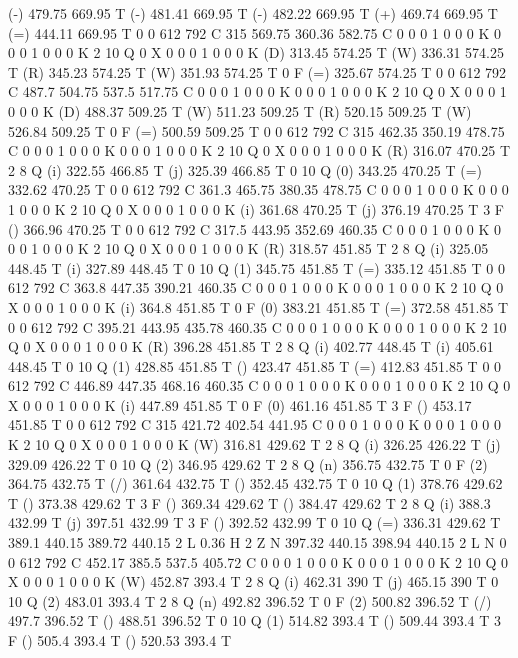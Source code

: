 (-) 479.75 669.95 T
(-) 481.41 669.95 T
(-) 482.22 669.95 T
(+) 469.74 669.95 T
(=) 444.11 669.95 T
0 0 612 792 C
315 569.75 360.36 582.75 C
0 0 0 1 0 0 0 K
0 0 0 1 0 0 0 K
2 10 Q
0 X
0 0 0 1 0 0 0 K
(D) 313.45 574.25 T
(W) 336.31 574.25 T
(R) 345.23 574.25 T
(W) 351.93 574.25 T
0 F
(=) 325.67 574.25 T
0 0 612 792 C
487.7 504.75 537.5 517.75 C
0 0 0 1 0 0 0 K
0 0 0 1 0 0 0 K
2 10 Q
0 X
0 0 0 1 0 0 0 K
(D) 488.37 509.25 T
(W) 511.23 509.25 T
(R) 520.15 509.25 T
(W) 526.84 509.25 T
0 F
(=) 500.59 509.25 T
0 0 612 792 C
315 462.35 350.19 478.75 C
0 0 0 1 0 0 0 K
0 0 0 1 0 0 0 K
2 10 Q
0 X
0 0 0 1 0 0 0 K
(R) 316.07 470.25 T
2 8 Q
(i) 322.55 466.85 T
(j) 325.39 466.85 T
0 10 Q
(0) 343.25 470.25 T
(=) 332.62 470.25 T
0 0 612 792 C
361.3 465.75 380.35 478.75 C
0 0 0 1 0 0 0 K
0 0 0 1 0 0 0 K
2 10 Q
0 X
0 0 0 1 0 0 0 K
(i) 361.68 470.25 T
(j) 376.19 470.25 T
3 F
() 366.96 470.25 T
0 0 612 792 C
317.5 443.95 352.69 460.35 C
0 0 0 1 0 0 0 K
0 0 0 1 0 0 0 K
2 10 Q
0 X
0 0 0 1 0 0 0 K
(R) 318.57 451.85 T
2 8 Q
(i) 325.05 448.45 T
(i) 327.89 448.45 T
0 10 Q
(1) 345.75 451.85 T
(=) 335.12 451.85 T
0 0 612 792 C
363.8 447.35 390.21 460.35 C
0 0 0 1 0 0 0 K
0 0 0 1 0 0 0 K
2 10 Q
0 X
0 0 0 1 0 0 0 K
(i) 364.8 451.85 T
0 F
(0) 383.21 451.85 T
(=) 372.58 451.85 T
0 0 612 792 C
395.21 443.95 435.78 460.35 C
0 0 0 1 0 0 0 K
0 0 0 1 0 0 0 K
2 10 Q
0 X
0 0 0 1 0 0 0 K
(R) 396.28 451.85 T
2 8 Q
(i) 402.77 448.45 T
(i) 405.61 448.45 T
0 10 Q
(1) 428.85 451.85 T
() 423.47 451.85 T
(=) 412.83 451.85 T
0 0 612 792 C
446.89 447.35 468.16 460.35 C
0 0 0 1 0 0 0 K
0 0 0 1 0 0 0 K
2 10 Q
0 X
0 0 0 1 0 0 0 K
(i) 447.89 451.85 T
0 F
(0) 461.16 451.85 T
3 F
() 453.17 451.85 T
0 0 612 792 C
315 421.72 402.54 441.95 C
0 0 0 1 0 0 0 K
0 0 0 1 0 0 0 K
2 10 Q
0 X
0 0 0 1 0 0 0 K
(W) 316.81 429.62 T
2 8 Q
(i) 326.25 426.22 T
(j) 329.09 426.22 T
0 10 Q
(2) 346.95 429.62 T
2 8 Q
(n) 356.75 432.75 T
0 F
(2) 364.75 432.75 T
(/) 361.64 432.75 T
() 352.45 432.75 T
0 10 Q
(1) 378.76 429.62 T
() 373.38 429.62 T
3 F
() 369.34 429.62 T
() 384.47 429.62 T
2 8 Q
(i) 388.3 432.99 T
(j) 397.51 432.99 T
3 F
() 392.52 432.99 T
0 10 Q
(=) 336.31 429.62 T
389.1 440.15 389.72 440.15 2 L
0.36 H
2 Z
N
397.32 440.15 398.94 440.15 2 L
N
0 0 612 792 C
452.17 385.5 537.5 405.72 C
0 0 0 1 0 0 0 K
0 0 0 1 0 0 0 K
2 10 Q
0 X
0 0 0 1 0 0 0 K
(W) 452.87 393.4 T
2 8 Q
(i) 462.31 390 T
(j) 465.15 390 T
0 10 Q
(2) 483.01 393.4 T
2 8 Q
(n) 492.82 396.52 T
0 F
(2) 500.82 396.52 T
(/) 497.7 396.52 T
() 488.51 396.52 T
0 10 Q
(1) 514.82 393.4 T
() 509.44 393.4 T
3 F
() 505.4 393.4 T
() 520.53 393.4 T
